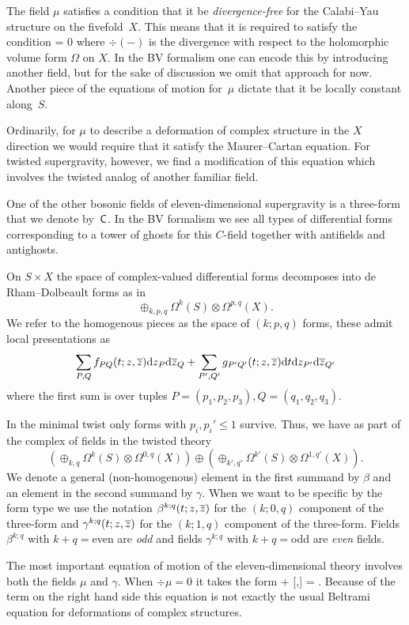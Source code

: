 \documentclass[11pt]{amsart}%
\begin{document}
The field $\mu$ satisfies a condition that it be {\em divergence-free} for the Calabi--Yau structure on the fivefold~$X$. 
This means that it is required to satisfy the condition 
\beqn
\div \mu = 0
\eeqn
where $\div(-)$ is the divergence with respect to the holomorphic volume form $\Omega$ on $X$.
In the BV formalism one can encode this by introducing another field, but for the sake of discussion we omit that approach for now.
Another piece of the equations of motion for~$\mu$ dictate that it be locally constant along~$S$.

Ordinarily, for $\mu$ to describe a deformation of complex structure in the $X$ direction we would require that it satisfy the Maurer--Cartan equation.
For twisted supergravity, however, we find a modification of this equation which involves the twisted analog of another familiar field.

One of the other bosonic fields of eleven-dimensional supergravity is a three-form that we denote by~$\sf C$.
In the BV formalism we see all types of differential forms corresponding to a tower of ghosts for this $C$-field together with antifields and antighosts. 
 
On $S \times X$ the space of complex-valued differential forms decomposes into de Rham--Dolbeault forms as in
\[
\oplus_{k,p,q} \Omega^k(S) \otimes \Omega^{p,q}(X) .
\]
We refer to the homogenous pieces as the space of $(k;p,q)$ forms, these admit local presentations as
\[
\sum_{P,Q} f_{PQ} (t;z,\overline{z}) {\rm d} z_P {\rm d} \overline{z}_Q + \sum_{P',Q'} g_{P'Q'}(t;z,\overline{z}) {\rm d} t {\rm d} z_{P'}{\rm d} \overline{z}_{Q'} 
\]
where the first sum is over tuples $P=(p_1,p_2,p_3),Q=(q_1,q_2,q_3)$.

In the minimal twist only forms with $p_i ,p_i'\leq 1$ survive. 
Thus, we have as part of the complex of fields in the twisted theory
\[
\left(\oplus_{k,q} \Omega^k(S) \otimes \Omega^{0,q}(X)\right) \oplus 
\left(\oplus_{k',q'} \Omega^{k'}(S) \otimes \Omega^{1,q'}(X)\right) .
\]
We denote a general (non-homogenous) element in the first summand by $\beta$ and an element in the second summand by $\gamma$.
When we want to be specific by the form type we use the notation $\beta^{k;q}(t;z,\overline{z})$ for the $(k;0,q)$ component of the three-form and $\gamma^{k;q}(t;z,\overline{z})$ for the $(k;1,q)$ component of the three-form.
Fields $\beta^{k;q}$ with $k+q = $even are {\em odd} and fields $\gamma^{k;q}$ with $k+q = $odd are {\em even} fields. 

The most important equation of motion of the eleven-dimensional theory involves both the fields $\mu$ and $\gamma$. 
When $\div \mu = 0$ it takes the form
\beqn\label{eqn:eom2}
\dbar \mu +  [\mu,\mu] = \del \gamma \del \gamma .
\eeqn
Because of the term on the right hand side this equation is not exactly the usual Beltrami equation for deformations of complex structures.
\end{document}
